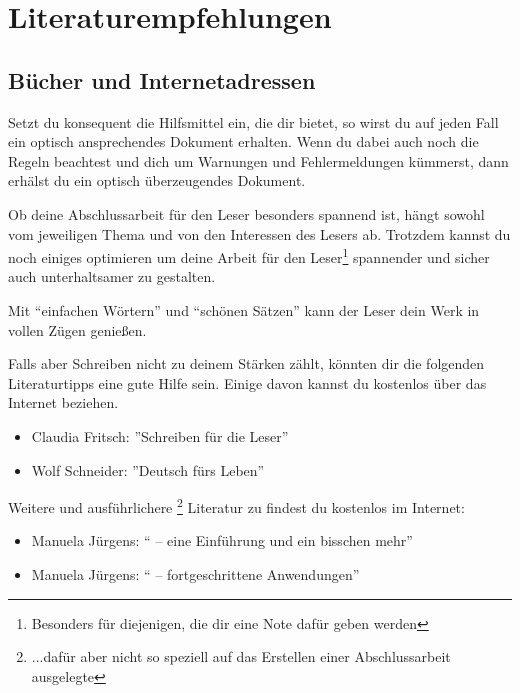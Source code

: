 
%

\chapter{Literaturempfehlungen}

\section{Bücher und Internetadressen}

Setzt du konsequent die Hilfsmittel ein, die \DMLLaTeX{} dir bietet, so wirst du auf jeden Fall ein optisch ansprechendes Dokument erhalten. Wenn du dabei auch noch die Regeln beachtest und dich um Warnungen und Fehlermeldungen kümmerst, dann erhälst du ein optisch überzeugendes Dokument.

Ob deine Abschlussarbeit für den Leser besonders spannend ist, hängt sowohl vom jeweiligen Thema und von den Interessen des Lesers ab. Trotzdem kannst du noch einiges optimieren um deine Arbeit für den Leser\footnote{Besonders für diejenigen, die dir eine Note dafür geben werden} spannender und sicher auch unterhaltsamer zu gestalten.

Mit \enquote{einfachen Wörtern} und \enquote{schönen Sätzen} kann der Leser dein Werk in vollen Zügen genießen.

Falls aber Schreiben nicht zu deinem Stärken zählt, könnten dir die folgenden Literaturtipps eine gute Hilfe sein. Einige davon kannst du kostenlos über das Internet beziehen.

\begin{itemize}
	\item{Claudia Fritsch: ''Schreiben für die Leser''\cite{fritsch:schreiben_fuer_die_Leser}}
	\item{Wolf Schneider: ''Deutsch fürs Leben''\cite{schneider:deutsch_fuers_leben}}
\end{itemize}

Weitere und ausführlichere \footnote{...dafür aber nicht so speziell auf das Erstellen einer Abschlussarbeit ausgelegte} Literatur zu \DMLLaTeX{} findest du kostenlos im Internet:

\begin{itemize}
	\item{Manuela Jürgens: \enquote{\DMLLaTeX{} -- eine Einführung und ein bisschen mehr}\cite{juergens:latex1}}
	\item{Manuela Jürgens: \enquote{\DMLLaTeX{} -- fortgeschrittene Anwendungen}\cite{juergens:latex2}}
\end{itemize}

